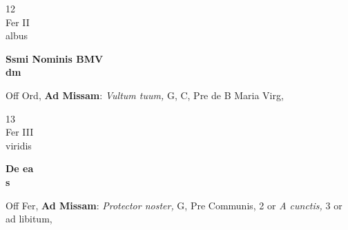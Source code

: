 \documentclass[10pt, openany]{book}
\begin{document}
        \begin{center}
            \begin{minipage}{3.5in}
                \vspace{2em}
                \begin{minipage}{0.5in}
                    {\Huge 12} \\
                    {\normalsize Fer II} \\
                    {\normalsize albus}
                \end{minipage}
                \begin{minipage}{3.0in}
                    \textbf{ \large Ssmi Nominis BMV \\
                    \textnormal{\normalsize dm}} \\ 
                \end{minipage}
                \begin{justify}Off Ord, \textbf{Ad Missam}: \textit{Vultum tuum,} G, C, Pre de B Maria Virg,  
                \end{justify}
            \end{minipage}
        \end{center}
    
        \begin{center}
            \begin{minipage}{3.5in}
                \vspace{2em}
                \begin{minipage}{0.5in}
                    {\Huge 13} \\
                    {\normalsize Fer III} \\
                    {\normalsize viridis}
                \end{minipage}
                \begin{minipage}{3.0in}
                    \textbf{ \large De ea \\
                    \textnormal{\normalsize s}} \\ 
                \end{minipage}
                \begin{justify}Off Fer, \textbf{Ad Missam}: \textit{Protector noster,} G, Pre Communis, 2 or \textit{A cunctis,} 3 or ad libitum,  
                \end{justify}
            \end{minipage}
        \end{center}
    
\end{document}
